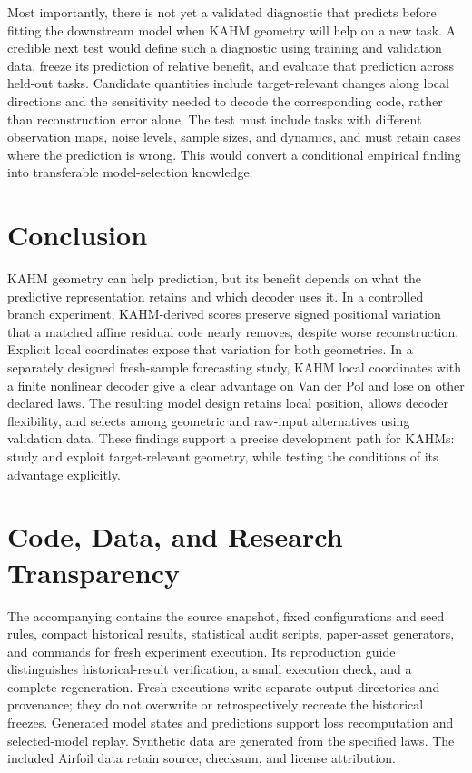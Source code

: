 \documentclass[10pt]{article}
\begin{document}
Most importantly, there is not yet a validated diagnostic that predicts
before fitting the downstream model when KAHM geometry will help on a
new task. A credible next test would define such a diagnostic using
training and validation data, freeze its prediction of relative benefit,
and evaluate that prediction across held-out tasks. Candidate quantities
include target-relevant changes along local directions and the sensitivity
needed to decode the corresponding code, rather than reconstruction
error alone. The test must include tasks with different observation maps,
noise levels, sample sizes, and dynamics, and must retain cases where
the prediction is wrong. This would convert a conditional empirical
finding into transferable model-selection knowledge.

\section{Conclusion}

KAHM geometry can help prediction, but its benefit depends on what the
predictive representation retains and which decoder uses it. In a
controlled branch experiment, KAHM-derived scores preserve signed
positional variation that a matched affine residual code nearly removes,
despite worse reconstruction. Explicit local coordinates expose that
variation for both geometries. In a separately designed fresh-sample
forecasting study, KAHM local coordinates with a finite nonlinear decoder
give a clear advantage on Van der Pol and lose on other declared laws.
The resulting model design retains local position, allows decoder
flexibility, and selects among geometric and raw-input alternatives using
validation data. These findings support a precise development path for
KAHMs: study and exploit target-relevant geometry, while testing the
conditions of its advantage explicitly.

\section*{Code, Data, and Research Transparency}

The accompanying  contains the source snapshot, fixed
configurations and seed rules, compact historical results, statistical
audit scripts, paper-asset generators, and commands for fresh experiment
execution. Its reproduction guide distinguishes
historical-result verification, a small execution check, and a complete
regeneration. Fresh executions write separate output directories and
provenance; they do not overwrite or retrospectively recreate the
historical freezes. Generated model states and predictions support
loss recomputation and selected-model replay. Synthetic data are generated
from the specified laws. The included Airfoil data retain source,
checksum, and license attribution.
\end{document}

